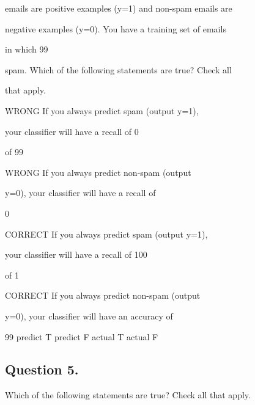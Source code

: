 \documentclass[11pt]{article} %
\begin{document}
emails are positive examples (y=1) and non-spam emails are

negative examples (y=0). You have a training set of emails

in which 99%

spam. Which of the following statements are true? Check all

that apply.


WRONG If you always predict spam (output y=1),

your classifier will have a recall of 0%

of 99%


WRONG If you always predict non-spam (output

y=0), your classifier will have a recall of

0%


CORRECT If you always predict spam (output y=1),

your classifier will have a recall of 100%

of 1%



CORRECT If you always predict non-spam (output

y=0), your classifier will have an accuracy of

99%
             predict T	predict F
actual T	
actual F

\subsection*{Question 5.}

Which of the following statements are true? Check all that apply.
\end{document}
